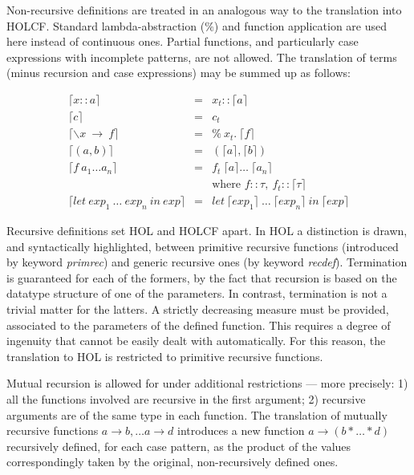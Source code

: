 \documentclass[a4paper,12pt]{article}
\begin{document}
Non-recursive definitions are treated in an analogous way to the
translation into HOLCF. Standard lambda-abstraction ($\%$) and
function application are used here instead of continuous ones. Partial
functions, and particularly case expressions with incomplete patterns,
are not allowed. The translation of terms (minus recursion and case
expressions) may be summed up as follows:

$$\begin{array}{lcl} 
  \lceil x::a \rceil & = & x_{t}::\lceil a \rceil \\
  \lceil c \rceil & = & c_{t} \\
  \lceil \backslash x \ \to \ f \rceil & = & \% \ x_{t}. \ \lceil f \rceil \\
  \lceil (a,b) \rceil & = & (\lceil a \rceil, \lceil b \rceil) \\
  \lceil f \ a_{1} \ldots a_{n} \rceil & = & f_{t} \ \lceil a \rceil \ldots \  \lceil a_{n} \rceil \\
  & & \mbox{where } f::\tau, \ f_{t}::\lceil \tau \rceil \\
  \lceil let \ exp_{1} \ \dots \ exp_{n} \ in \ exp \rceil & = 
  & let \ \lceil exp_{1} \rceil \ \dots \ \lceil exp_{n} \rceil \ in \ \lceil exp \rceil 
\end{array}$$

\noindent Recursive definitions set HOL and HOLCF apart.  In HOL a
distinction is drawn, and syntactically highlighted, between primitive
recursive functions (introduced by keyword \emph{primrec}) and generic
recursive ones (by keyword \emph{recdef}).  Termination is guaranteed
for each of the formers, by the fact that recursion is based on the
datatype structure of one of the parameters. In contrast, termination
is not a trivial matter for the latters. A strictly decreasing measure
must be provided, associated to the parameters of the defined
function. This requires a degree of ingenuity that cannot be easily
dealt with automatically. For this reason, the translation to HOL is
restricted to primitive recursive functions.

Mutual recursion is allowed for under additional restrictions --- more
precisely: 1) all the functions involved are recursive in the first
argument; 2) recursive arguments are of the same type in each
function.  The translation of mutually recursive functions $a
\rightarrow b, \ldots a \rightarrow d$ introduces a new function $a
\rightarrow (b * \ldots * d)$ recursively defined, for each case
pattern, as the product of the values
correspondingly taken by the original, non-recursively defined ones. \\
\end{document}
